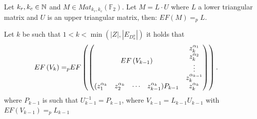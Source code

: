 \documentclass[11pt]{llncs}
\begin{document}
\begin{remark}\label{rem:rowEchelonForm}
    Let $k_r, k_c \in \mathbb{N}$ and $M\in Mat_{k_r,k_c}(\mathbb{F}_2)$. Let $M = L\cdot U$ where $L$ a lower triangular matrix and $U$ is an upper triangular matrix, then: $EF(M) =_p L$.
\end{remark}

\begin{proposition}\label{prop:rowEchelonForm}
    Let $k$ be such that $1<k< \min{\left(|Z|,|E_{D_n^n}|\right)}$ it holds that
    \begin{align*}
        EF\left(V_{k}\right) =_p & EF
        \begin{pmatrix}
        \begin{pmatrix}
            \multicolumn{4}{c}{\multirow{4}{*}{$EF\left(V_{k-1}\right)$}} & z_k^{\alpha_1}\\
            & & & & z_k^{\alpha_2}\\
            & & & & \vdots\\
            & & & & z_{k}^{\alpha_{k-1}}\\
            (z_1^{\alpha_{k}} & z_2^{\alpha_{k}}& \cdots & z_{k-1}^{\alpha_{k}})P_{k-1} & z_{k}^{\alpha_k}
        \end{pmatrix}
        \end{pmatrix}.
    \end{align*}
    where $P_{k-1}$ is such that $U_{k-1}^{-1} = P_{k-1}$, where $V_{k-1} = L_{k-1}U_{k-1}$ with $EF(V_{k-1})=_p L_{k-1}$
\end{proposition}
\end{document}
